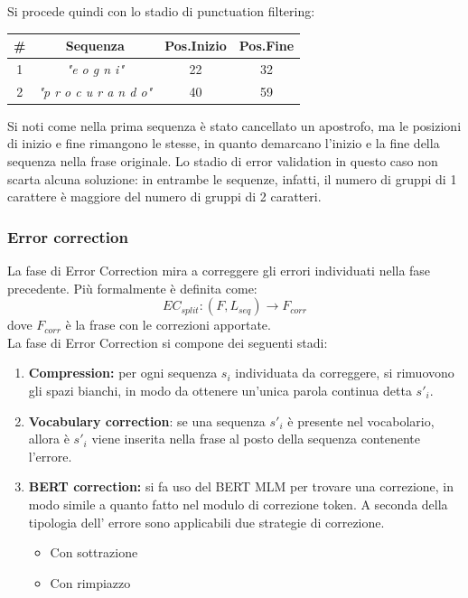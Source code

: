 Si procede quindi con lo stadio di punctuation filtering:
\begin{table}[H]
\centering
\begin{tabular}{cccc}
\#&\textbf{Sequenza} & \textbf{Pos.Inizio} & \textbf{Pos.Fine}\\ \hline
1&\textit{"e o g n i"}&22& 32\\
2&\textit{"p r o c u r a n d o"}& 40& 59\\
\end{tabular}
\end{table}
Si noti come nella prima sequenza è stato cancellato un apostrofo, ma le posizioni di inizio e fine rimangono le stesse, in quanto demarcano l'inizio e la fine della sequenza nella frase originale. Lo stadio di error validation in questo caso non scarta alcuna soluzione: in entrambe le sequenze, infatti, il numero di gruppi di 1 carattere è maggiore del numero di gruppi di 2 caratteri.

\subsubsection{Error correction}
\label{sec:met_split_errcor}
La fase di Error Correction mira a correggere gli errori individuati nella fase precedente. Più formalmente è definita come:
\begin{equation}
EC_{split}: (F,L_{seq}) \rightarrow F_{corr}
\end{equation}
dove $F_{corr}$ è la frase con le correzioni apportate.\\
La fase di Error Correction si compone dei seguenti stadi:
\begin{enumerate}
\item \textbf{Compression:} per ogni sequenza $s_i$ individuata da correggere, si rimuovono gli spazi bianchi, in modo da ottenere un'unica parola continua detta $s\prime_i$.
\item \textbf{Vocabulary correction}: se una sequenza $s\prime_i$ è presente nel vocabolario, allora è $s\prime_i$ viene inserita nella frase al posto della sequenza contenente l'errore.
\item \textbf{BERT correction:} si fa uso del BERT MLM per trovare una correzione, in modo simile a quanto fatto nel modulo di correzione token. A seconda della tipologia dell' errore sono applicabili due strategie di correzione.
		\begin{itemize}
		\item Con sottrazione		
		\item Con rimpiazzo		
		\end{itemize}
\end{enumerate}

